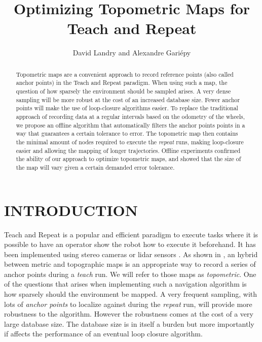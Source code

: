 \documentclass[letterpaper,10 pt,conference]{ieeeconf}
\title{\LARGE \bf
  Optimizing Topometric Maps for Teach and Repeat
}
\author{David Landry and Alexandre Gari\'epy}
\begin{document}
\maketitle
\thispagestyle{empty}
\pagestyle{empty}


\begin{abstract} Topometric maps are a convenient approach to record reference points (also called
anchor points) in the Teach and Repeat paradigm. When using such a map, the question of how sparsely
the environment should be sampled arises. A very dense sampling will be more robust at the cost of
an increased database size. Fewer anchor points will make the use of loop-closure algorithms
easier. To replace the traditional approach of recording data at a regular intervals based on the
odometry of the wheels, we propose an offline algorithm that automatically filters the anchor points
points in a way that guarantees a certain tolerance to error. The topometric map then contains the
minimal amount of nodes required to execute the \textit{repeat} runs, making loop-closure easier and
allowing the mapping of longer trajectories. Offline experiments confirmed the ability of our
approach to optimize topometric maps, and showed that the size of the map will vary given a certain
demanded error tolerance.
\end{abstract}

\section{INTRODUCTION}

Teach and Repeat is a popular and efficient paradigm to execute tasks where it is possible to have
an operator show the robot how to execute it beforehand. It has been implemented using stereo
cameras \cite{Furgale10} or lidar sensors \cite{Sprunk13}. As shown in \cite{Furgale10}, an hybrid
between metric and topographic maps is an appropriate way to record a series of anchor points during
a \textit{teach} run. We will refer to those maps as \textit{topometric}. One of the questions that
arises when implementing such a navigation algorithm is how sparsely should the environment
be mapped. A very frequent sampling, with lots of \textit{anchor points} to localize against during
the \textit{repeat} run, will provide more robustness to the algorithm. However the robustness comes
at the cost of a very large database size. The database size is in itself a burden but more
importantly if affects the performance of an eventual loop closure algorithm.
\end{document}
